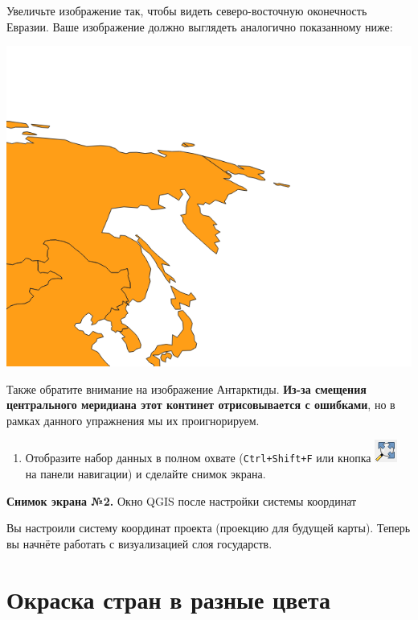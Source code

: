 \documentclass[
  12pt,
]{book}
\providecommand{\tightlist}{%
  \setlength{\itemsep}{0pt}\setlength{\parskip}{0pt}}
\begin{document}
Увеличьте изображение так, чтобы видеть северо-восточную оконечность Евразии. Ваше изображение должно выглядеть аналогично показанному ниже:

\includegraphics{images/Ex01_WorldMap/Chukotka.png}

Также обратите внимание на изображение Антарктиды. \textbf{Из-за смещения центрального меридиана этот континет отрисовывается с ошибками}, но в рамках данного упражнения мы их проигнорируем.

\begin{enumerate}
\def\labelenumi{\arabic{enumi}.}
\setcounter{enumi}{19}
\tightlist
\item
  Отобразите набор данных в полном охвате (\texttt{Ctrl+Shift+F} или кнопка \includegraphics{images/Ex01_WorldMap/fullExtentButton.png} на панели навигации) и сделайте снимок экрана.
\end{enumerate}

\textbf{Снимок экрана №2.} Окно QGIS после настройки системы координат

Вы настроили систему координат проекта (проекцию для будущей карты). Теперь вы начнёте работать с визуализацией слоя государств.

\hypertarget{map-design-world-colorbrewer}{%
\section{Окраска стран в разные цвета}\label{map-design-world-colorbrewer}}
\end{document}
